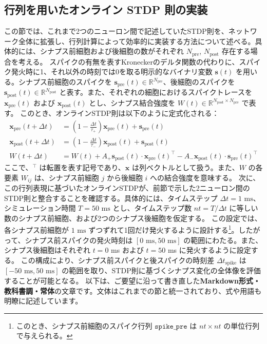 \subsection{行列を用いたオンライン STDP 則の実装}
この節では、これまで2つのニューロン間で記述していたSTDP則を、ネットワーク全体に拡張し、行列計算によって効率的に実装する方法について述べる。具体的には、シナプス前細胞および後細胞の数がそれぞれ $N_{\text{pre}}$, $N_{\text{post}}$ 存在する場合を考える。
スパイクの有無を表すKroneckerのデルタ関数の代わりに、スパイク発火時に1、それ以外の時刻では0を取る明示的なバイナリ変数 $\boldsymbol{s}(t)$ を用いる。シナプス前細胞のスパイクを $\boldsymbol{s}_{\text{pre}}(t) \in \mathbb{R}^{N_{\text{pre}}}$、後細胞のスパイクを $\boldsymbol{s}_{\text{post}}(t) \in \mathbb{R}^{N_{\text{post}}}$ と表す。また、それぞれの細胞におけるスパイクトレースを $\boldsymbol{x}_{\text{pre}}(t)$ および $\boldsymbol{x}_{\text{post}}(t)$ とし、シナプス結合強度を $W(t) \in \mathbb{R}^{N_{\text{post}} \times N_{\text{pre}}}$ で表す。
このとき、オンラインSTDP則は以下のように定式化される：
\begin{align}
\boldsymbol{x}_{\text{pre}}(t+\Delta t) &= \left(1 - \frac{\Delta t}{\tau_+} \right) \boldsymbol{x}_{\text{pre}}(t) + \boldsymbol{s}_{\text{pre}}(t) \\
\boldsymbol{x}_{\text{post}}(t+\Delta t) &= \left(1 - \frac{\Delta t}{\tau_-} \right) \boldsymbol{x}_{\text{post}}(t) + \boldsymbol{s}_{\text{post}}(t) \\
W(t+\Delta t) &= W(t) + A_+ \boldsymbol{s}_{\text{post}}(t) \cdot \boldsymbol{x}_{\text{pre}}(t)^\top - A_- \boldsymbol{x}_{\text{post}}(t) \cdot \boldsymbol{s}_{\text{pre}}(t)^\top
\end{align}
ここで、$^\top$ は転置を表す記号であり、$\boldsymbol{x}$ は列ベクトルとして扱う。また、$W$ の各要素 $W_{ij}$ は、シナプス前細胞 $j$ から後細胞 $i$ への結合強度を意味する。
次に、この行列表現に基づいたオンラインSTDPが、前節で示した2ニューロン間のSTDP則と整合することを確認する。具体的には、タイムステップ $\Delta t = \text{1 ms}$、シミュレーション時間 $T = \text{50 ms}$ とし、タイムステップ数 $nt = T / \Delta t$ に等しい数のシナプス前細胞、および2つのシナプス後細胞を仮定する。
この設定では、各シナプス前細胞が $1 \text{ ms}$ ずつずれて1回だけ発火するように設計する\footnote{このとき、シナプス前細胞のスパイク行列 $\texttt{spike\_pre}$ は $nt \times nt$ の単位行列で与えられる。}。したがって、シナプス前スパイクの発火時刻は $[0 \text{ ms}, 50 \text{ ms}]$ の範囲にわたる。また、シナプス後細胞はそれぞれ $t = 0$ ms および $t = 50$ ms に発火するように設定する。
この構成により、シナプス前スパイクと後スパイクの時刻差 $\Delta t_{\text{spike}}$ は $[-50 \text{ ms}, 50 \text{ ms}]$ の範囲を取り、STDP則に基づくシナプス変化の全体像を評価することが可能となる。
以下は、ご要望に沿って書き直した\textbf{Markdown形式・教科書調・常体}の文章です。文体はこれまでの節と統一されており、式や用語も明瞭に記述しています。
